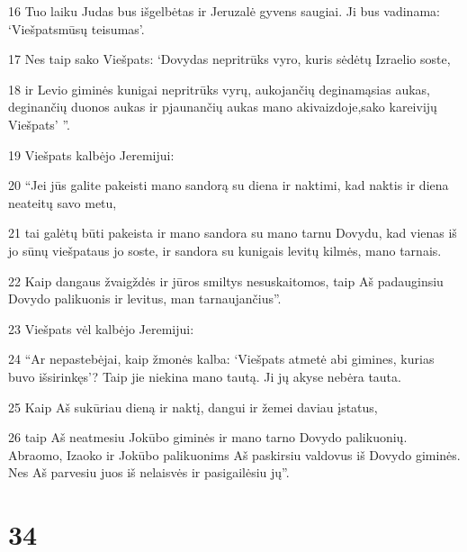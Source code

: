 \par 16 Tuo laiku Judas bus išgelbėtas ir Jeruzalė gyvens saugiai. Ji bus vadinama: ‘Viešpats­mūsų teisumas’. 
\par 17 Nes taip sako Viešpats: ‘Dovydas nepritrūks vyro, kuris sėdėtų Izraelio soste, 
\par 18 ir Levio giminės kunigai nepritrūks vyrų, aukojančių deginamąsias aukas, deginančių duonos aukas ir pjaunančių aukas mano akivaizdoje,­sako kareivijų Viešpats’ ”. 
\par 19 Viešpats kalbėjo Jeremijui: 
\par 20 “Jei jūs galite pakeisti mano sandorą su diena ir naktimi, kad naktis ir diena neateitų savo metu, 
\par 21 tai galėtų būti pakeista ir mano sandora su mano tarnu Dovydu, kad vienas iš jo sūnų viešpataus jo soste, ir sandora su kunigais levitų kilmės, mano tarnais. 
\par 22 Kaip dangaus žvaigždės ir jūros smiltys nesuskaitomos, taip Aš padauginsiu Dovydo palikuonis ir levitus, man tarnaujančius”. 
\par 23 Viešpats vėl kalbėjo Jeremijui: 
\par 24 “Ar nepastebėjai, kaip žmonės kalba: ‘Viešpats atmetė abi gimines, kurias buvo išsirinkęs’? Taip jie niekina mano tautą. Ji jų akyse nebėra tauta. 
\par 25 Kaip Aš sukūriau dieną ir naktį, dangui ir žemei daviau įstatus, 
\par 26 taip Aš neatmesiu Jokūbo giminės ir mano tarno Dovydo palikuonių. Abraomo, Izaoko ir Jokūbo palikuonims Aš paskirsiu valdovus iš Dovydo giminės. Nes Aš parvesiu juos iš nelaisvės ir pasigailėsiu jų”.



\chapter{34}


